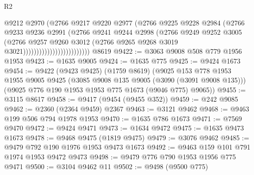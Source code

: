 \begin{lexlean}{R2}
\begin{coremodule}
                                        @9212
                                        @2970
                                        (@2766
                                          @9217
                                          @9220
                                          @2977
                                          (@2766
                                            @9225
                                            @9228
                                            @2984
                                            (@2766
                                              @9233
                                              @9236
                                              @2991
                                              (@2766
                                                @9241
                                                @9244
                                                @2998
                                                (@2766
                                                  @9249
                                                  @9252
                                                  @3005
                                                  (@2766
                                                    @9257
                                                    @9260
                                                    @3012
                                                    (@2766
                                                      @9265
                                                      @9268
                                                      @3019
                                                      @3021)))))))))))))))))))))))))
    @8619
@9422 := @3063 @9008 @508 @779 @1956 @1953
@9423 := @1635 @9005
@9424 := @1635 @775
@9425 := @9424 @1673
@9454 := @9422
    (@9423 @9425)
    (@1759 @8619)
    (@9025
      @153
      @778
      @1953
      @1955
      @9005
      @9425
      (@3085 @9008 @135 @9005 (@3090 (@3091 @9008 @135)))
      (@9025 @776 @190 @1953 @1953 @775 @1673 (@9046 @775) @9065))
@9455 := @3115 @8617
@9458 := @9417 (@9454 (@9455 @352))
@9459 := @242 @9085
@9462 := @2360 (@2364 @9459) @2367
@9463 := @3121 @9462
@9468 := @9463 @199 @506 @794 @1978 @1953
@9470 := @1635 @786 @1673
@9471 := @7569 @9470
@9472 := @9424 @9471
@9473 := @1634 @9472
@9475 := @1635 @9473 @1673
@9478 := @9468 @9475 (@1819 @9475)
@9479 := @3076 @9462
@9485 := @9479 @792 @190 @1976 @1953 @9473 @1673
@9492 := @9463 @159 @101 @791 @1974 @1953 @9472 @9473
@9498 := @9479 @776 @790 @1953 @1956 @775 @9471
@9500 := @3104 @9462 @11
@9502 := @9498 (@9500 @775)

\end{coremodule}
\end{lexlean}
